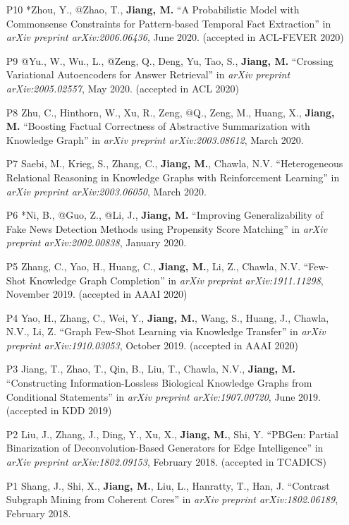 \documentclass[10pt]{article}
\newenvironment{myindentpar}[1]%
{\begin{list}{}%
         {\setlength{\leftmargin}{#1}}%
         \item[]%
}
{\end{list}}
\newcounter{list}
\begin{document}
\begin{myindentpar}{0.00cm}
\begin{enumerate}[leftmargin=.5cm]
\item[P10] *Zhou, Y., @Zhao, T., \textbf{Jiang, M.} ``A Probabilistic Model with Commonsense Constraints for Pattern-based Temporal Fact Extraction'' in \textit{arXiv preprint arXiv:2006.06436}, June 2020. (accepted in ACL-FEVER 2020)

\item[P9] @Yu., W., Wu., L., @Zeng, Q., Deng, Yu, Tao, S., \textbf{Jiang, M.} ``Crossing Variational Autoencoders for Answer Retrieval'' in \textit{arXiv preprint arXiv:2005.02557}, May 2020. (accepted in ACL 2020)
		
\item[P8] Zhu, C., Hinthorn, W., Xu, R., Zeng, @Q., Zeng, M., Huang, X., \textbf{Jiang, M.} ``Boosting Factual Correctness of Abstractive Summarization with Knowledge Graph'' in \textit{arXiv preprint arXiv:2003.08612}, March 2020.

\item[P7] Saebi, M., Krieg, S., Zhang, C., \textbf{Jiang, M.}, Chawla, N.V. ``Heterogeneous Relational Reasoning in Knowledge Graphs with Reinforcement Learning'' in \textit{arXiv preprint arXiv:2003.06050}, March 2020.

\item[P6] *Ni, B., @Guo, Z., @Li, J., \textbf{Jiang, M.} ``Improving Generalizability of Fake News Detection Methods using Propensity Score Matching'' in \textit{arXiv preprint arXiv:2002.00838}, January 2020.
		
\item[P5] Zhang, C., Yao, H., Huang, C., \textbf{Jiang, M.}, Li, Z., Chawla, N.V. ``Few-Shot Knowledge Graph Completion'' in \textit{arXiv preprint arXiv:1911.11298}, November 2019. (accepted in AAAI 2020)

\item[P4] Yao, H., Zhang, C., Wei, Y., \textbf{Jiang, M.}, Wang, S., Huang, J., Chawla, N.V., Li, Z. ``Graph Few-Shot Learning via Knowledge Transfer'' in \textit{arXiv preprint arXiv:1910.03053}, October 2019. (accepted in AAAI 2020)
		
\item[P3] Jiang, T., Zhao, T., Qin, B., Liu, T., Chawla, N.V., \textbf{Jiang, M.} ``Constructing Information-Lossless Biological Knowledge Graphs from Conditional Statements'' in \textit{arXiv preprint arXiv:1907.00720}, June 2019. (accepted in KDD 2019)
		
\item[P2] Liu, J., Zhang, J., Ding, Y., Xu, X., \textbf{Jiang, M.}, Shi, Y. ``PBGen: Partial Binarization of Deconvolution-Based Generators for Edge Intelligence'' in \textit{arXiv preprint arXiv:1802.09153}, February 2018. (accepted in TCADICS)
		
\item[P1] Shang, J., Shi, X., \textbf{Jiang, M.}, Liu, L., Hanratty, T., Han, J. ``Contrast Subgraph Mining from Coherent Cores'' in \textit{arXiv preprint arXiv:1802.06189}, February 2018.

\end{enumerate}

\end{myindentpar}
\end{document}
